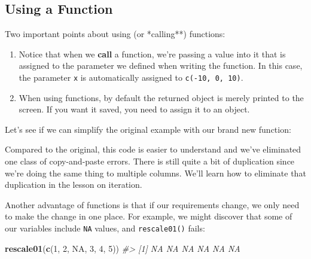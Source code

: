 \documentclass[]{book}
\newenvironment{Shaded}{\begin{snugshade}}{\end{snugshade}}
\newcommand{\KeywordTok}[1]{\textcolor[rgb]{0.13,0.29,0.53}{\textbf{#1}}}
\newcommand{\DecValTok}[1]{\textcolor[rgb]{0.00,0.00,0.81}{#1}}
\newcommand{\StringTok}[1]{\textcolor[rgb]{0.31,0.60,0.02}{#1}}
\newcommand{\CommentTok}[1]{\textcolor[rgb]{0.56,0.35,0.01}{\textit{#1}}}
\newcommand{\OtherTok}[1]{\textcolor[rgb]{0.56,0.35,0.01}{#1}}
\newcommand{\OperatorTok}[1]{\textcolor[rgb]{0.81,0.36,0.00}{\textbf{#1}}}
\newcommand{\NormalTok}[1]{#1}
\begin{document}
\subsection{Using a Function}\label{using-a-function}

Two important points about using (or *calling**) functions:

\begin{enumerate}
\def\labelenumi{\arabic{enumi}.}
\item
  Notice that when we \textbf{call} a function, we're passing a value
  into it that is assigned to the parameter we defined when writing the
  function. In this case, the parameter \texttt{x} is automatically
  assigned to \texttt{c(-10,\ 0,\ 10)}.
\item
  When using functions, by default the returned object is merely printed
  to the screen. If you want it saved, you need to assign it to an
  object.
\end{enumerate}

Let's see if we can simplify the original example with our brand new
function:

\begin{Shaded}
\end{Shaded}

Compared to the original, this code is easier to understand and we've
eliminated one class of copy-and-paste errors. There is still quite a
bit of duplication since we're doing the same thing to multiple columns.
We'll learn how to eliminate that duplication in the lesson on
iteration.

Another advantage of functions is that if our requirements change, we
only need to make the change in one place. For example, we might
discover that some of our variables include \texttt{NA} values, and
\texttt{rescale01()} fails:

\begin{Shaded}
\begin{Highlighting}[]
\KeywordTok{rescale01}\NormalTok{(}\KeywordTok{c}\NormalTok{(}\DecValTok{1}\NormalTok{, }\DecValTok{2}\NormalTok{, }\OtherTok{NA}\NormalTok{, }\DecValTok{3}\NormalTok{, }\DecValTok{4}\NormalTok{, }\DecValTok{5}\NormalTok{))}
\CommentTok{#> [1] NA NA NA NA NA NA}
\end{Highlighting}
\end{Shaded}
\end{document}
